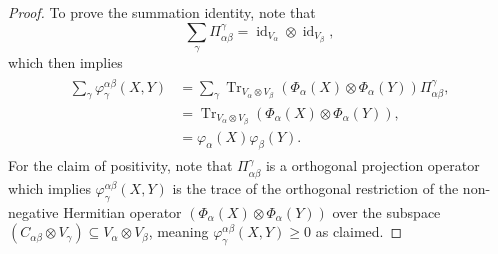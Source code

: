\documentclass[pdflatex, sn-mathphys-num]{sn-jnl} %
\theoremstyle{plain}
\theoremstyle{definition}
\DeclareMathOperator{\Tr}{Tr}
\DeclareMathOperator{\id}{id}
\newcommand{\ot}{\otimes} %
\newcommand{\vp}{\varphi} %
\newcommand{\ya}{\alpha}
\newcommand{\yb}{\beta}
\newcommand{\yc}{\gamma}
\begin{document}
\begin{proof}
    To prove the summation identity, note that
    \begin{equation}
        \sum_{\yc} \Pi_{\ya\yb}^\yc = \id_{V_{\ya}} \ot \id_{V_{\yb}},
    \end{equation}
    which then implies
    \begin{align}
        \begin{split}
            \sum_\yc \vp^{\ya \yb}_\yc(X, Y)
            &= \sum_\yc \Tr_{V_\ya \ot V_\yb}  (\Phi_\ya(X) \ot \Phi_\ya(Y))\Pi_{\ya\yb}^\yc, \\
            &= \Tr_{V_\ya \ot V_\yb} (\Phi_\ya(X) \ot \Phi_\ya(Y)), \\
            &= \vp_\ya(X) \vp_\yb(Y).
        \end{split}
    \end{align}
    For the claim of positivity, note that $\Pi_{\ya\yb}^\yc$ is a orthogonal projection operator which implies $\vp^{\ya \yb}_\yc(X, Y)$ is the trace of the orthogonal restriction of the non-negative Hermitian operator $(\Phi_\ya(X) \ot \Phi_\ya(Y))$ over the subspace $(C_{\ya \yb} \ot V_\yc) \subseteq V_\ya \ot V_\yb$, meaning $\vp^{\ya \yb}_\yc(X, Y) \geq 0$ as claimed.
\end{proof}
\end{document}
